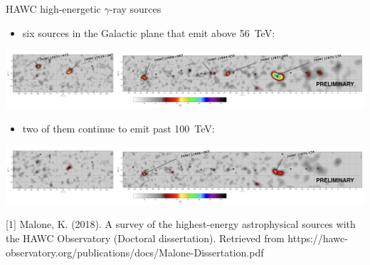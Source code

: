 \begin{frame}{HAWC high-energetic $\gamma$-ray sources}

\begin{itemize}
  \item six sources in the Galactic plane that emit above 56~TeV:
\end{itemize}
\includegraphics[width=1\textwidth]{pics/HWC_above_56TeV.png}
\begin{itemize}
  \item two of them continue to emit past 100~TeV:
\end{itemize}
\includegraphics[width=1\textwidth]{pics/HWC_above_100TeV.png}

\small
[1] Malone, K. (2018). A survey of the highest-energy astrophysical sources with the HAWC Observatory (Doctoral dissertation).
Retrieved from https://hawc-observatory.org/publications/docs/Malone-Dissertation.pdf

\end{frame}

